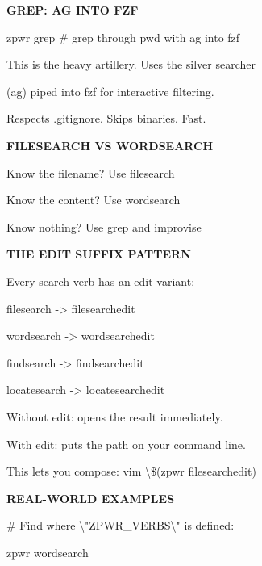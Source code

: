 \documentclass[11pt,a4paper,twoside]{book}
\begin{document}
\vspace{12pt}
{\bfseries\color{neonyellow} GREP: AG INTO FZF}\vspace{4pt}

\begin{codebox}
zpwr grep               \# grep through pwd with ag into fzf\\
\end{codebox}

This is the heavy artillery. Uses the silver searcher

(ag) piped into fzf for interactive filtering.

Respects .gitignore. Skips binaries. Fast.


\vspace{12pt}
{\bfseries\color{neonyellow} FILESEARCH VS WORDSEARCH}\vspace{4pt}

Know the filename?     Use filesearch

Know the content?      Use wordsearch

Know nothing?          Use grep and improvise


\vspace{12pt}
{\bfseries\color{neonyellow} THE EDIT SUFFIX PATTERN}\vspace{4pt}

Every search verb has an edit variant:

filesearch     -> filesearchedit

wordsearch     -> wordsearchedit

findsearch     -> findsearchedit

locatesearch   -> locatesearchedit

Without edit: opens the result immediately.

With edit: puts the path on your command line.

\begin{codebox}
This lets you compose: vim \textbackslash{}\$(zpwr filesearchedit)\\
\end{codebox}


\vspace{12pt}
{\bfseries\color{neonyellow} REAL-WORLD EXAMPLES}\vspace{4pt}

\# Find where \textbackslash{}"ZPWR\_VERBS\textbackslash{}" is defined:

\begin{codebox}
zpwr wordsearch\\
\end{codebox}
\end{document}

